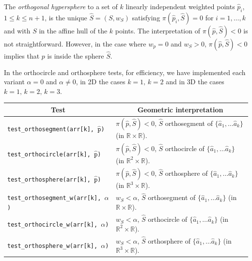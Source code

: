 \documentclass[12pt]{article}
\theoremstyle{definition}
\theoremstyle{remark}
\begin{document}
The \emph{orthogonal hypersphere} to a set of $k$ linearly independent weighted points $\hat p_i$, $1 \leq k \leq n+1$, is the unique $\hat{S} = (S, w_S)$ satisfying $\pi(\hat{p}_i, \hat{S}) = 0$ for  $i = 1, \ldots, k$ and with $S$ in the affine hull of the $k$ points. The interpretation of $\pi(\hat p, \hat S) <0$ is not straightforward. However, in the case where $w_p = 0$ and $w_S > 0$, $\pi(\hat p, \hat S) <0$ implies that $p$ is inside the sphere $\hat S$.

\bigskip

In the orthocircle and orthosphere tests, for efficiency, we have implemented each variant $\alpha = 0$ and $\alpha \neq 0$, in 2D the cases $k=1, \, k=2$ and in 3D the cases $k=1, \, k=2, \, k=3$.

\begin{table}[h]
\begin{tabular}{|l|l|}
\hline
\multicolumn{1}{|c|}{\textbf{Test}} &  
\multicolumn{1}{c|}{\textbf{Geometric interpretation}}\\
\hline\hline
\texttt{test\_orthosegment(arr[k], \!\!$\hat{\texttt{p}}$)} & $\pi (\hat p, \hat S) < 0 $, $\hat S$ orthosegment of $\{\hat a_1, \ldots \hat a_k \}$ (in $\mathbb{R}\times \mathbb{R}$).\\
\hline
\texttt{test\_orthocircle(arr[k], \!\!$\hat{\texttt{p}}$)} & $\pi (\hat p, \hat S) < 0 $, $\hat S$ orthocircle of $\{\hat a_1, \ldots \hat a_k \}$ (in $\mathbb{R}^2\times \mathbb{R}$).\\
\hline
\texttt{test\_orthosphere(arr[k], \!\!$\hat{\texttt{p}}$)} & $\pi (\hat p, \hat S) < 0 $, $\hat S$ orthosphere of $\{\hat a_1, \ldots \hat a_k \}$ (in $\mathbb{R}^3 \times \mathbb{R}$). \\
\hline \hline
\texttt{test\_orthosegment\_w(arr[k], \!\!$\alpha$)} & $ w_S < \alpha $, $\hat S$ orthosegment of $\{\hat a_1, \ldots \hat a_k \}$ (in $\mathbb{R}\times \mathbb{R}$).\\
\hline
\texttt{test\_orthocircle\_w(arr[k], \!\!$\alpha$)} & $w_S < \alpha $, $\hat S$ orthocircle of $\{\hat a_1, \ldots \hat a_k \}$ (in $\mathbb{R}^2\times \mathbb{R}$).\\
\hline
\texttt{test\_orthosphere\_w(arr[k], \!\!$\alpha$)} & $w_S < \alpha $, $\hat S$ orthosphere of $\{\hat a_1, \ldots \hat a_k \}$ (in $\mathbb{R}^3 \times \mathbb{R}$). \\
\hline
\end{tabular}
\end{table}
\end{document}
